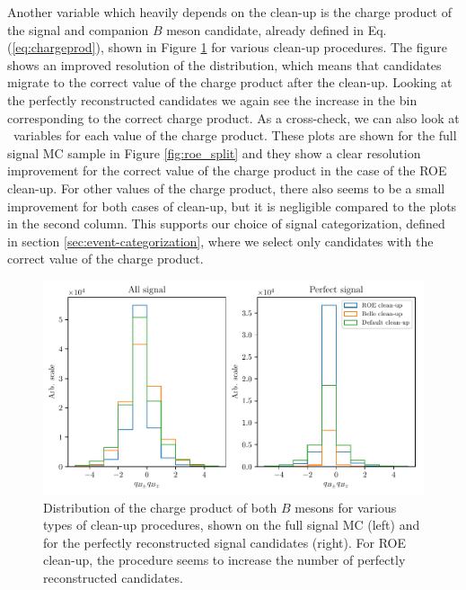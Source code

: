 Another variable which heavily depends on the clean-up is the charge product of the signal and companion $B$ meson candidate, already defined in Eq. (\ref{eq:chargeprod}), shown in Figure \ref{fig:roe_chargeproduct} for various clean-up procedures. The figure shows an improved resolution of the distribution, which means that candidates migrate to the correct value of the charge product after the clean-up. Looking at the perfectly reconstructed candidates we again see the increase in the bin corresponding to the correct charge product. As a cross-check, we can also look at \vars~variables for each value of the charge product. These plots are shown for the full signal MC sample in Figure \ref{fig:roe_split} and they show a clear resolution improvement for the correct value of the charge product in the case of the ROE clean-up. For other values of the charge product, there also seems to be a small improvement for both cases of clean-up, but it is negligible compared to the plots in the second column. This supports our choice of signal categorization, defined in section \ref{sec:event-categorization}, where we select only candidates with the correct value of the charge product.

\begin{figure}[!htb]
	\centering
	\captionsetup{width=0.8\linewidth}
	\includegraphics[width=\linewidth]{fig/roe_chargeprod}
	\caption{Distribution of the charge product of both $B$ mesons for various types of clean-up procedures, shown on the full signal MC (left) and for the perfectly reconstructed signal candidates (right). For ROE clean-up, the procedure seems to increase the number of perfectly reconstructed candidates.}
	\label{fig:roe_chargeproduct}
\end{figure}

